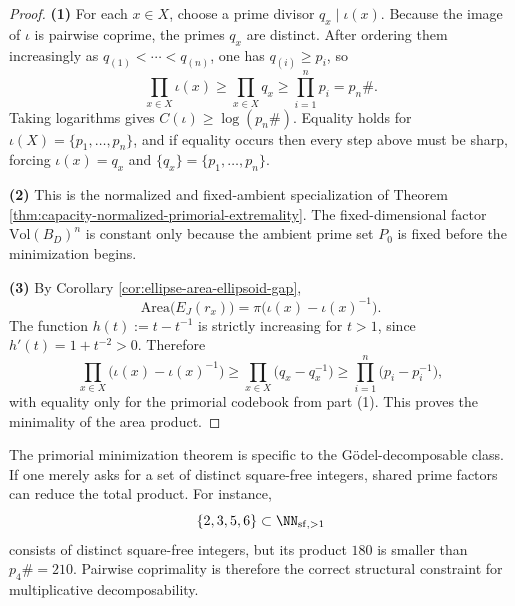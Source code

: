 \begin{proof}
\textbf{(1)} For each \(x\in X\), choose a prime divisor \(q_x\mid \iota(x)\). Because the image of \(\iota\) is pairwise coprime, the primes \(q_x\) are distinct. After ordering them increasingly as \(q_{(1)}<\cdots<q_{(n)}\), one has \(q_{(i)}\ge p_i\), so
\[
\prod_{x\in X}\iota(x)\ge \prod_{x\in X}q_x\ge \prod_{i=1}^{n}p_i=p_n\#.
\]
Taking logarithms gives \(C(\iota)\ge \log(p_n\#)\). Equality holds for \(\iota(X)=\{p_1,\dots,p_n\}\), and if equality occurs then every step above must be sharp, forcing \(\iota(x)=q_x\) and \(\{q_x\}=\{p_1,\dots,p_n\}\).

\textbf{(2)} This is the normalized and fixed-ambient specialization of Theorem \ref{thm:capacity-normalized-primorial-extremality}. The fixed-dimensional factor \(\mathrm{Vol}(B_D)^n\) is constant only because the ambient prime set \(P_0\) is fixed before the minimization begins.

\textbf{(3)} By Corollary \ref{cor:ellipse-area-ellipsoid-gap},
\[
\mathrm{Area}\bigl(E_J(r_x)\bigr)=\pi\bigl(\iota(x)-\iota(x)^{-1}\bigr).
\]
The function \(h(t):=t-t^{-1}\) is strictly increasing for \(t>1\), since \(h'(t)=1+t^{-2}>0\). Therefore
\[
\prod_{x\in X}\bigl(\iota(x)-\iota(x)^{-1}\bigr)
\ge
\prod_{x\in X}\bigl(q_x-q_x^{-1}\bigr)
\ge
\prod_{i=1}^{n}\bigl(p_i-p_i^{-1}\bigr),
\]
with equality only for the primorial codebook from part (1). This proves the minimality of the area product.
\end{proof}

\begin{remark}\label{rem:min-total-godel-cost-coprime-necessity}
The primorial minimization theorem is specific to the G\"odel-decomposable class. If one merely asks for a set of distinct square-free integers, shared prime factors can reduce the total product. For instance,
\[
\{2,3,5,6\}\subset \NN_{\mathrm{sf},>1}
\]
consists of distinct square-free integers, but its product \(180\) is smaller than \(p_4\#=210\). Pairwise coprimality is therefore the correct structural constraint for multiplicative decomposability.
\end{remark}

\endinput



